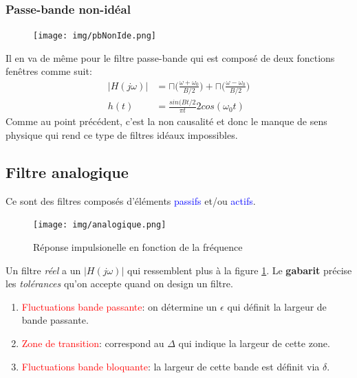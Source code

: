 \documentclass{report}
\begin{document}
\subsubsection{Passe-bande non-idéal}
\begin{figure}
\centering
\texttt{[image: img/pbNonIde.png]}
\end{figure}
Il en va de même pour le filtre passe-bande qui est composé de deux fonctions fenêtres comme suit:
\begin{align*}
|H(j\omega)| &= \sqcap \bigr(\frac{\omega + \omega_0}{B/2}\bigr) + \sqcap \bigr(\frac{\omega - \omega_0}{B/2}\bigr)\\
h(t) &= \frac{sin(Bt/2}{\pi t}2 cos(\omega_0 t)
\end{align*}
Comme au point précédent, c'est la non causalité et donc le manque de sens physique qui rend ce type de filtres idéaux impossibles.

\subsection{Filtre analogique}
Ce sont des filtres composés d'éléments \textcolor{blue}{passifs} et/ou \textcolor{blue}{actifs}. 
\begin{figure}[H]
\centering
\texttt{[image: img/analogique.png]}
\caption{Réponse impulsionelle en fonction de la fréquence}
\label{analogique}
\end{figure}

Un filtre \textit{réel} a un $|H(j\omega)|$ qui ressemblent plus à la figure \ref{analogique}. Le \textbf{gabarit} précise les \textit{tolérances} qu'on accepte quand on design un filtre.
\begin{enumerate}
\item \textcolor{red}{Fluctuations bande passante}: on détermine un $\epsilon$ qui définit la largeur de bande passante.
\item \textcolor{red}{Zone de transition}: correspond au $\Delta$ qui indique la largeur de cette zone.
\item \textcolor{red}{Fluctuations bande bloquante}: la largeur de cette bande est définit via $\delta$.
\end{enumerate}
\end{document}
